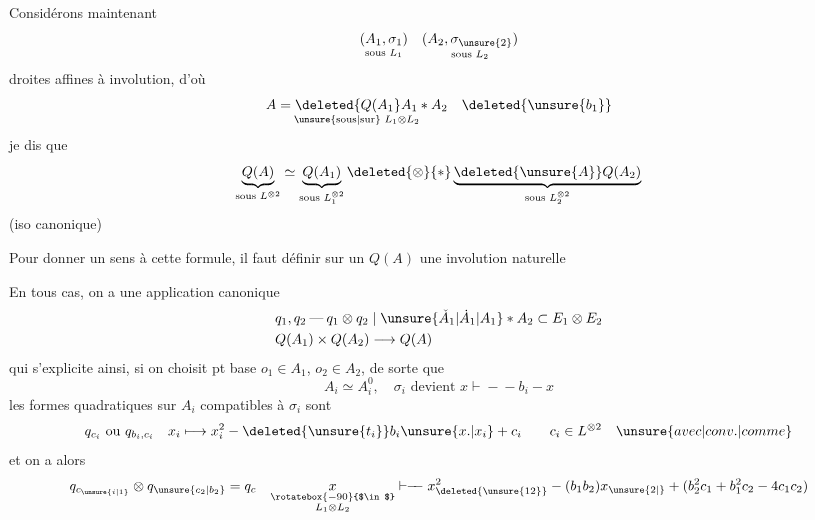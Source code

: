 Considérons maintenant
\[
\underset{\text{sous }L_1}{(A_1,\sigma_1)}\quad
\underset{\text{sous }L_2}{(A_2,\sigma_{\unsure{2}})}
\]
droites affines à involution, d'où
\[
\underset{\text{\unsure{sous|sur} }L_1\otimes L_2}{A=\deleted{Q(A_1}A_1*A_2}
\quad\deleted{\unsure{b_1}}
\]
je dis que
\[
\underbrace{Q(A)}_{\text{sous }L^{\otimes 2}}\simeq
\underbrace{Q(A_1)}_{\text{sous }L_1^{\otimes 2}}
\deleted{\otimes}{*}\underbrace{\deleted{\unsure{A}}Q(A_2)}_{\text{sous }L_2^{\otimes 2}}
\]
(iso canonique)

Pour donner un sens à cette
formule, il faut définir sur un
$Q(A)$ une involution naturelle

En tous cas,  on a
une application canonique
\[
\begin{aligned}
&q_1,q_2\mathbin{\text{---}}q_1\otimes q_2\mid \unsure{\check A_1|\dot A_1|A_1}*A_2\subset E_1\otimes E_2\\
&Q(A_1)\times Q(A_2)\longrightarrow Q(A)
\end{aligned}
\]
qui s'explicite ainsi, si on choisit
 pt base $o_1\in A_1$, $o_2\in A_2$, de sorte
que
\[
A_i\simeq A_i^0,\quad \sigma_i\text{ devient }x\mathrel{\vdash\!\!-\!\!-}b_i-x
\]
les formes quadratiques sur $A_i$ compatibles
à $\sigma_i$ sont
\[
q_{c_i}\text{ ou }q_{b_i,c_i}\quad x_i\longmapsto x_i^2-\deleted{\unsure{t_i}}b_i\unsure{x.|x_i}+c_i
\qquad c_i\in L^{\otimes 2}\quad\unsure{avec|conv.|comme}
\]
et on a alors
\[
q_{c_{\unsure{i|1}}}\otimes q_{\unsure{c_2|b_2}}=q_c\quad
\underset{\substack{\rotatebox{-90}{$\in$}\\L_1\otimes L_2}}{x}
\mathrel{\vdash\!\!-\!\!-}x_{\deleted{\unsure{12}}}^{2}-(b_1b_2)x_{\unsure{2|{}}}+
(b_2^2c_1+b_1^2c_2-4c_1c_2)
\]
